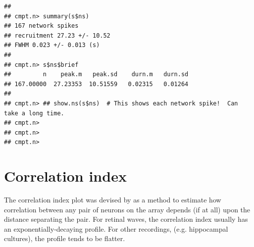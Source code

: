 \documentclass{article}\usepackage[]{graphicx}\usepackage[]{color}
\makeatletter
\newenvironment{kframe}{%
 \def\at@end@of@kframe{}%
 \ifinner\ifhmode%
  \def\at@end@of@kframe{\end{minipage}}%
  \begin{minipage}{\columnwidth}%
 \fi\fi%
 \def\FrameCommand##1{\hskip\@totalleftmargin \hskip-\fboxsep
 \colorbox{shadecolor}{##1}\hskip-\fboxsep
     \hskip-\linewidth \hskip-\@totalleftmargin \hskip\columnwidth}%
 \MakeFramed {\advance\hsize-\width
   \@totalleftmargin\z@ \linewidth\hsize
   \@setminipage}}%
 {\par\unskip\endMakeFramed%
 \at@end@of@kframe}
\newenvironment{knitrout}{}{} %
\makeatother
\begin{document}
\begin{knitrout}
\begin{kframe}\begin{verbatim}
## 
## cmpt.n> summary(s$ns)
## 167 network spikes
## recruitment 27.23 +/- 10.52
## FWHM 0.023 +/- 0.013 (s)
## 
## cmpt.n> s$ns$brief
##         n    peak.m   peak.sd    durn.m   durn.sd 
## 167.00000  27.23353  10.51559   0.02315   0.01264 
## 
## cmpt.n> ## show.ns(s$ns)  # This shows each network spike!  Can take a long time.
## cmpt.n> 
## cmpt.n> 
## cmpt.n>
\end{verbatim}
\end{kframe}
\end{knitrout}


\section*{Correlation index}

The correlation index plot was devised by \citet{Wong1993} as a method to
estimate how correlation between any pair of neurons on the array
depends (if at all) upon the distance separating the pair.  For
retinal waves, the correlation index usually has an
exponentially-decaying profile.  For other recordings,
(e.g. hippocampal cultures), the profile tends to be flatter.
\end{document}
